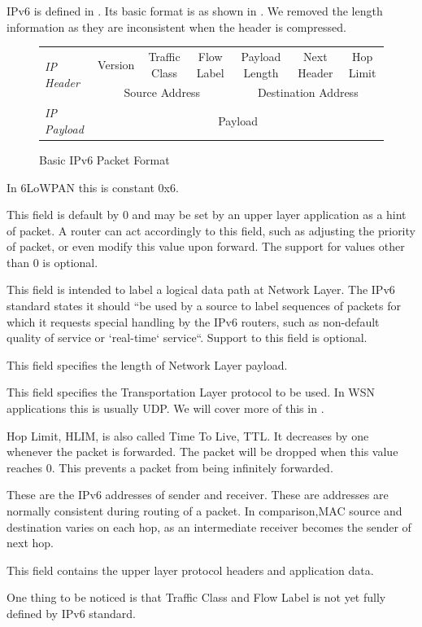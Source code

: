 IPv6 is defined in \cite{rfc2460}. Its basic format is as shown in . We removed the length information as they are inconsistent when the header is compressed.

\begin{figure}[h!]
\center
	\begin{tabular}{l|c|c|c|c|c|c|}
	\cline{2-7}
	\multirow{2}{*}{\textit{IP Header}} & Version & Traffic Class & Flow Label & Payload Length & Next Header & Hop Limit \\ \cline{2-7} 
	                                & \multicolumn{3}{c|}{Source Address}  & \multicolumn{3}{c|}{Destination Address} \\ \cline{2-7} 
	\textit{IP Payload}                 & \multicolumn{6}{c|}{Payload}                                                    \\ \cline{2-7} 
	\end{tabular}
	\caption{Basic IPv6 Packet Format} \label{Fig: IPv6 Packet Format}
\end{figure}

\begin{description}[style=nextline]
	\item[\textbf{Version}]
	In 6LoWPAN this is constant 0x6.
	\item[\textbf{Traffic Class}]
	This field is default by 0 and may be set by an upper layer application as a hint of packet. A router can act accordingly to this field, such as adjusting the priority of packet, or even modify this value upon forward. The support for values other than $0$ is optional.
	\item[\textbf{Flow Label}]
	This field is intended to label a logical data path at Network Layer. The IPv6 standard\cite{rfc2460} states  it should ``be used by a source to label sequences of packets for which it requests special handling by the IPv6 routers, such as non-default quality of service or `real-time` service``. Support to this field is optional.
	\item[\textbf{Payload Length}]
	This field specifies the length of Network Layer payload.
	\item[\textbf{Next Header}]
	This field specifies the Transportation Layer protocol to be used. In WSN applications this is usually UDP. We will cover more of this in .
	\item[\textbf{Hop Limit}]
	Hop Limit, HLIM, is also called Time To Live, TTL. It decreases by one whenever the packet is forwarded. The packet will be dropped when this value reaches $0$. This prevents a packet from being infinitely forwarded.
	\item[\textbf{Source Address and Destination Address}]
	These are the IPv6 addresses of sender and receiver. These are addresses are normally consistent during routing of a packet. In comparison,MAC source and destination varies on each hop, as an intermediate receiver becomes the sender of next hop.
	\item[\textbf{Payload}]
	This field contains the upper layer protocol headers and application data.
\end{description}
One thing to be noticed is that Traffic Class and Flow Label is not yet fully defined by IPv6 standard.


